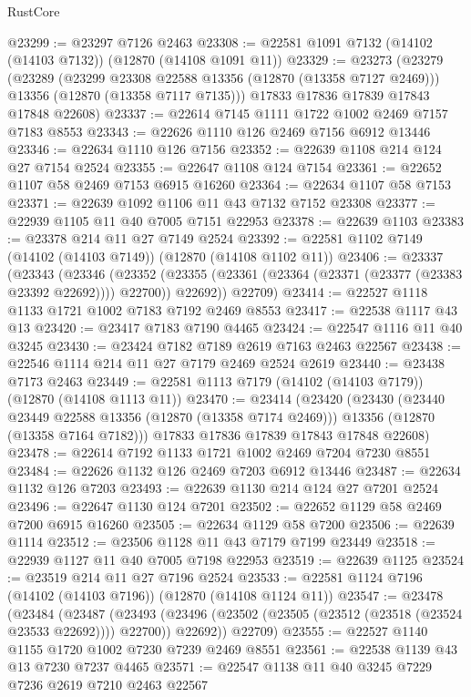 \begin{lexlean}{RustCore}
\begin{coremodule}
@23299 := @23297 @7126 @2463
@23308 := @22581 @1091 @7132 (@14102 (@14103 @7132)) (@12870 (@14108 @1091 @11))
@23329 := @23273
    (@23279
      (@23289
        (@23299 @23308 @22588 @13356 (@12870 (@13358 @7127 @2469)))
        @13356
        (@12870 (@13358 @7117 @7135)))
      @17833
      @17836
      @17839
      @17843
      @17848
      @22608)
@23337 := @22614 @7145 @1111 @1722 @1002 @2469 @7157 @7183 @8553
@23343 := @22626 @1110 @126 @2469 @7156 @6912 @13446
@23346 := @22634 @1110 @126 @7156
@23352 := @22639 @1108 @214 @124 @27 @7154 @2524
@23355 := @22647 @1108 @124 @7154
@23361 := @22652 @1107 @58 @2469 @7153 @6915 @16260
@23364 := @22634 @1107 @58 @7153
@23371 := @22639 @1092 @1106 @11 @43 @7132 @7152 @23308
@23377 := @22939 @1105 @11 @40 @7005 @7151 @22953
@23378 := @22639 @1103
@23383 := @23378 @214 @11 @27 @7149 @2524
@23392 := @22581 @1102 @7149 (@14102 (@14103 @7149)) (@12870 (@14108 @1102 @11))
@23406 := @23337
    (@23343
      (@23346
        (@23352 (@23355 (@23361 (@23364 (@23371 (@23377 (@23383 @23392 @22692)))) @22700)) @22692))
      @22709)
@23414 := @22527 @1118 @1133 @1721 @1002 @7183 @7192 @2469 @8553
@23417 := @22538 @1117 @43 @13
@23420 := @23417 @7183 @7190 @4465
@23424 := @22547 @1116 @11 @40 @3245
@23430 := @23424 @7182 @7189 @2619 @7163 @2463 @22567
@23438 := @22546 @1114 @214 @11 @27 @7179 @2469 @2524 @2619
@23440 := @23438 @7173 @2463
@23449 := @22581 @1113 @7179 (@14102 (@14103 @7179)) (@12870 (@14108 @1113 @11))
@23470 := @23414
    (@23420
      (@23430
        (@23440 @23449 @22588 @13356 (@12870 (@13358 @7174 @2469)))
        @13356
        (@12870 (@13358 @7164 @7182)))
      @17833
      @17836
      @17839
      @17843
      @17848
      @22608)
@23478 := @22614 @7192 @1133 @1721 @1002 @2469 @7204 @7230 @8551
@23484 := @22626 @1132 @126 @2469 @7203 @6912 @13446
@23487 := @22634 @1132 @126 @7203
@23493 := @22639 @1130 @214 @124 @27 @7201 @2524
@23496 := @22647 @1130 @124 @7201
@23502 := @22652 @1129 @58 @2469 @7200 @6915 @16260
@23505 := @22634 @1129 @58 @7200
@23506 := @22639 @1114
@23512 := @23506 @1128 @11 @43 @7179 @7199 @23449
@23518 := @22939 @1127 @11 @40 @7005 @7198 @22953
@23519 := @22639 @1125
@23524 := @23519 @214 @11 @27 @7196 @2524
@23533 := @22581 @1124 @7196 (@14102 (@14103 @7196)) (@12870 (@14108 @1124 @11))
@23547 := @23478
    (@23484
      (@23487
        (@23493 (@23496 (@23502 (@23505 (@23512 (@23518 (@23524 @23533 @22692)))) @22700)) @22692))
      @22709)
@23555 := @22527 @1140 @1155 @1720 @1002 @7230 @7239 @2469 @8551
@23561 := @22538 @1139 @43 @13 @7230 @7237 @4465
@23571 := @22547 @1138 @11 @40 @3245 @7229 @7236 @2619 @7210 @2463 @22567

\end{coremodule}
\end{lexlean}
